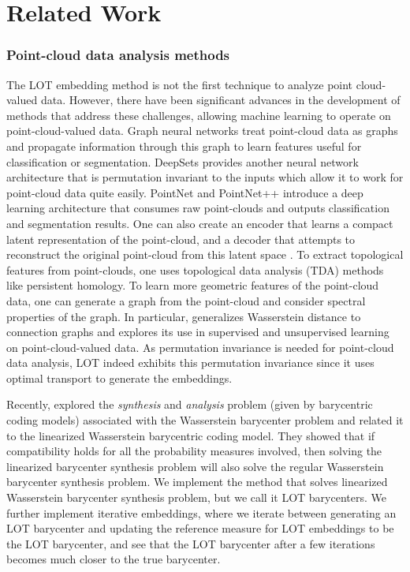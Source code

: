 \section{Related Work}
\subsubsection{Point-cloud data analysis methods}

The LOT embedding method is not the first technique to analyze point cloud-valued data. However, there have been significant advances in the development of methods that address these challenges, allowing machine learning to operate on point-cloud-valued data. Graph neural networks \cite{wang2019} treat point-cloud data as graphs and propagate information through this graph to learn features useful for classification or segmentation. 
DeepSets \cite{zaheer2017deepsets} provides another neural network architecture that is permutation invariant to the inputs which allow it to work for point-cloud data quite easily.  PointNet \cite{qi2017} and PointNet++ \cite{qi2017pointnetplus} introduce a deep learning architecture that consumes raw point-clouds and outputs classification and segmentation results. One can also create an encoder that learns a compact latent representation of the point-cloud, and a decoder that attempts to reconstruct the original point-cloud from this latent space \cite{achlioptas2018learning}. To extract topological features from point-clouds, one uses topological data analysis (TDA) methods \cite{cao2022} like persistent homology. To learn more geometric features of the point-cloud data, one can generate a graph from the point-cloud and consider spectral properties of the graph. In particular, \cite{robertson2024} generalizes Wasserstein distance to connection graphs and explores its use in supervised and unsupervised learning on point-cloud-valued data. As permutation invariance is needed for point-cloud data analysis, LOT indeed exhibits this permutation invariance since it uses optimal transport to generate the embeddings.

Recently, \cite{werenski2024} explored the \textit{synthesis} and \textit{analysis} problem (given by barycentric coding models) associated with the Wasserstein barycenter problem and related it to the linearized Wasserstein barycentric coding model. They showed that if compatibility holds for all the probability measures involved, then solving the linearized barycenter synthesis problem will also solve the regular Wasserstein barycenter synthesis problem.  We implement the method that solves linearized Wasserstein barycenter synthesis problem, but we call it LOT barycenters.  We further implement iterative embeddings, where we iterate between generating an LOT barycenter and updating the reference measure for LOT embeddings to be the LOT barycenter, and see that the LOT barycenter after a few iterations becomes much closer to the true barycenter.

